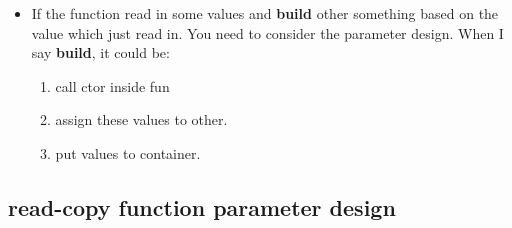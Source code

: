 \documentclass[a4paper,11pt,twoside]{book}
\begin{document}
\begin{itemize}
\item If the function read in some values and \textbf{build} other something based on the value which just read in. You need to consider the parameter design. When I say \textbf{build}, it could be:
\begin{enumerate}
	\item call ctor inside fun
	\item assign these values to other.
	\item put values to container.
\end{enumerate} 
\end{itemize}

\subsection{read-copy function parameter design}
\end{document}
